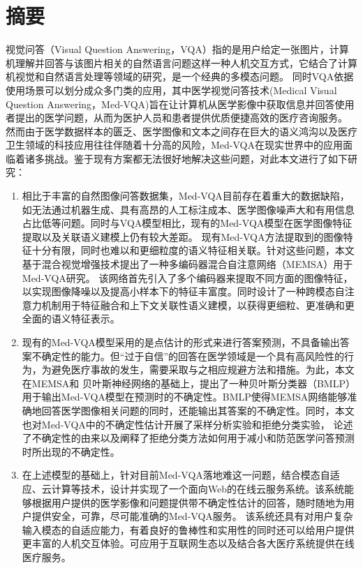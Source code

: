 \chapter{摘\texorpdfstring{\quad}{}要}
	视觉问答（Visual Question Answering，VQA）指的是用户给定一张图片，计算机理解并回答与该图片相关的自然语言问题这样一种人机交互方式，它结合了计算机视觉和自然语言处理等领域的研究，是一个经典的多模态问题。
	同时VQA依据使用场景可以划分成众多门类的应用，其中医学视觉问答技术(Medical Visual Question Answering，Med-VQA)旨在让计算机从医学影像中获取信息并回答使用者提出的医学问题，从而为医护人员和患者提供优质便捷高效的医疗咨询服务。
	然而由于医学数据样本的匮乏、医学图像和文本之间存在巨大的语义鸿沟以及医疗卫生领域的科技应用往往伴随着十分高的风险，Med-VQA在现实世界中的应用面临着诸多挑战。鉴于现有方案都无法很好地解决这些问题，对此本文进行了如下研究：
	\begin{enumerate}
		\item 相比于丰富的自然图像问答数据集，Med-VQA目前存在着重大的数据缺陷，如无法通过机器生成、具有高昂的人工标注成本、医学图像噪声大和有用信息占比低等问题。同时与VQA模型相比，现有的Med-VQA模型在医学图像特征提取以及关联语义建模上仍有较大差距。
		现有Med-VQA方法提取到的图像特征十分有限，同时也难以和更细粒度的语义特征相关联。针对这些问题，本文基于混合视觉增强技术提出了一种多编码器混合自注意网络（MEMSA）用于Med-VQA研究。
		该网络首先引入了多个编码器来提取不同方面的图像特征，以实现图像降噪以及提高小样本下的特征丰富度。同时设计了一种跨模态自注意力机制用于特征融合和上下文关联性语义建模，以获得更细粒、更准确和更全面的语义特征表示。
		\item 现有的Med-VQA模型采用的是点估计的形式来进行答案预测，不具备输出答案不确定性的能力。但“过于自信”的回答在医学领域是一个具有高风险性的行为，为避免医疗事故的发生，需要采取与之相应规避方法和措施。为此，本文在MEMSA和
		贝叶斯神经网络的基础上，提出了一种贝叶斯分类器（BMLP）用于输出Med-VQA模型在预测时的不确定性。BMLP使得MEMSA网络能够准确地回答医学图像相关问题的同时，还能输出其答案的不确定性。同时，本文也对Med-VQA中的不确定性估计开展了采样分析实验和拒绝分类实验，
		论述了不确定性的由来以及阐释了拒绝分类方法如何用于减小和防范医学问答预测时所出现的不确定性。
		\item 在上述模型的基础上，针对目前Med-VQA落地难这一问题，结合模态自适应、云计算等技术，设计并实现了一个面向Web的在线云服务系统。该系统能够根据用户提供的医学影像和问题提供带不确定性估计的回答，随时随地为用户提供安全，可靠，尽可能准确的Med-VQA服务。
		该系统还具有对用户复杂输入模态的自适应能力，有着良好的鲁棒性和实用性的同时还可以给用户提供更丰富的人机交互体验。可应用于互联网生态以及结合各大医疗系统提供在线医疗服务。
	\end{enumerate}	

